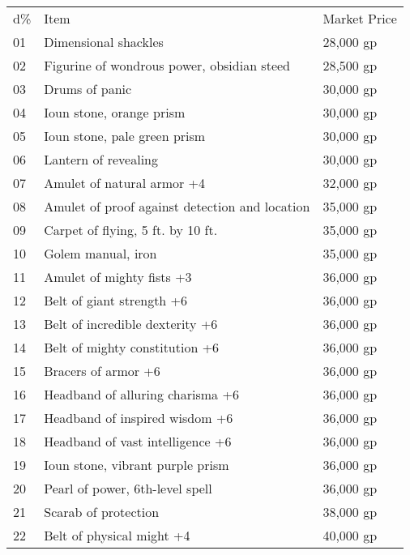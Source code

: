 \setlength{\tabcolsep}{1pt}
\begin{xtabular}{lll}
d\% & Item                                           & Market Price \\
01  & Dimensional shackles                           & 28,000 gp    \\
02  & Figurine of wondrous power, obsidian steed     & 28,500 gp    \\
03  & Drums of panic                                 & 30,000 gp    \\
04  & Ioun stone, orange prism                       & 30,000 gp    \\
05  & Ioun stone, pale green prism                   & 30,000 gp    \\
06  & Lantern of revealing                           & 30,000 gp    \\
07  & Amulet of natural armor +4                     & 32,000 gp    \\
08  & Amulet of proof against detection and location & 35,000 gp    \\
09  & Carpet of flying, 5 ft. by 10 ft.              & 35,000 gp    \\
10  & Golem manual, iron                             & 35,000 gp    \\
11  & Amulet of mighty fists +3                      & 36,000 gp    \\
12  & Belt of giant strength +6                      & 36,000 gp    \\
13  & Belt of incredible dexterity +6                & 36,000 gp    \\
14  & Belt of mighty constitution +6                 & 36,000 gp    \\
15  & Bracers of armor +6                            & 36,000 gp    \\
16  & Headband of alluring charisma +6               & 36,000 gp    \\
17  & Headband of inspired wisdom +6                 & 36,000 gp    \\
18  & Headband of vast intelligence +6               & 36,000 gp    \\
19  & Ioun stone, vibrant purple prism               & 36,000 gp    \\
20  & Pearl of power, 6th-level spell                & 36,000 gp    \\
21  & Scarab of protection                           & 38,000 gp    \\
22  & Belt of physical might +4                      & 40,000 gp    \\

\end{xtabular}
